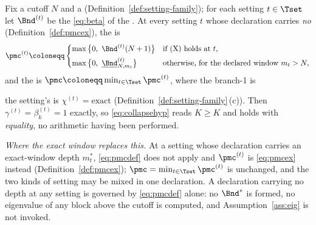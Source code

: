\begin{definition}\label{def:pmc}
Fix a cutoff $N$ and a 
(Definition~\ref{def:setting-family}); for each setting $t\in\Tset$ let
$\Bnd^{(t)}$ be the  \eqref{eq:beta} of the
. At every setting $t$ whose declaration
carries \emph{no}  (Definition~\ref{def:pmcex}),
the
is
\begin{equation}\label{eq:pmcdef}
  \pmc^{(t)}\coloneqq
  \begin{cases}
    \max\big\{0,\ \Bnd^{(t)}(N+1)\big\}
      &\text{if (X) holds at }t,\\[4pt]
    \max\big\{0,\ \underline{\Bnd}^{(t)}_{N,m_t}\big\}
      &\text{otherwise, for the declared window }m_t>N,
  \end{cases}
\end{equation}
and the
is $\pmc\coloneqq\min_{t\in\Tset}\pmc^{(t)}$, where the branch-1
is
\begin{description}[leftmargin=3.2em,style=nextline]
\item[(X) \emph{exact by construction, decidable from the declaration:}] the
  setting's  is $\chi^{(t)}=\mathrm{exact}$
  (Definition~\ref{def:setting-family}\,(c)). Then
  $\gamma^{(t)}=\beta^{(t)}_k=1$ exactly, so \eqref{eq:collapsehyp} reads
  $K\ge K$ and holds with \emph{equality}, no arithmetic having been
  performed.
\end{description}
\emph{Where the exact window replaces this.} At a setting whose declaration
carries an exact-window depth $m^{\ast}_t$, \eqref{eq:pmcdef} does not apply
and $\pmc^{(t)}$ is \eqref{eq:pmcex} instead
(Definition~\ref{def:pmcex}); $\pmc=\min_{t\in\Tset}\pmc^{(t)}$ is unchanged,
and the two kinds of setting may be mixed in one declaration. A declaration
carrying no depth at any setting is governed by \eqref{eq:pmcdef} alone: no
$\Bnd^{\ast}$ is formed, no eigenvalue of any block above the cutoff is
computed, and Assumption~\ref{ass:eig} is not invoked.
\end{definition}
